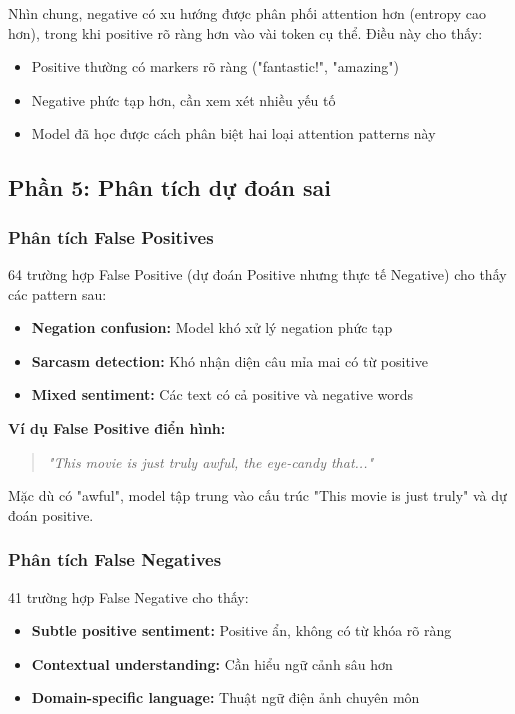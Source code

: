 Nhìn chung, negative có xu hướng được phân phối attention hơn (entropy cao hơn), trong khi positive rõ ràng hơn vào vài token cụ thể. Điều này cho thấy:
\begin{itemize}
    \item Positive thường có markers rõ ràng ("fantastic!", "amazing")
    \item Negative phức tạp hơn, cần xem xét nhiều yếu tố
    \item Model đã học được cách phân biệt hai loại attention patterns này
\end{itemize}

\subsection{Phần 5: Phân tích dự đoán sai}
\label{ssec:comprehensive_error_analysis}

\subsubsection{Phân tích False Positives}

64 trường hợp False Positive (dự đoán Positive nhưng thực tế Negative) cho thấy các pattern sau:

\begin{itemize}
    \item \textbf{Negation confusion:} Model khó xử lý negation phức tạp
    \item \textbf{Sarcasm detection:} Khó nhận diện câu mỉa mai có từ positive
    \item \textbf{Mixed sentiment:} Các text có cả positive và negative words
\end{itemize}

\textbf{Ví dụ False Positive điển hình:}
\begin{quote}
\textit{"This movie is just truly awful, the eye-candy that..."}
\end{quote}
Mặc dù có "awful", model tập trung vào cấu trúc  "This movie is just truly" và dự đoán positive.

\subsubsection{Phân tích False Negatives}

41 trường hợp False Negative cho thấy:

\begin{itemize}
    \item \textbf{Subtle positive sentiment:} Positive ẩn, không có từ khóa rõ ràng
    \item \textbf{Contextual understanding:} Cần hiểu ngữ cảnh sâu hơn
    \item \textbf{Domain-specific language:} Thuật ngữ điện ảnh chuyên môn
\end{itemize}

